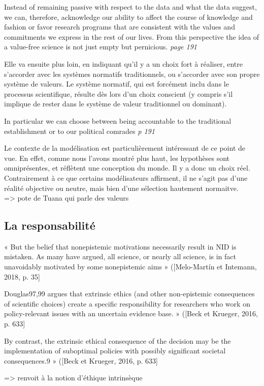 \begin{displayquote}
    Instead of remaining passive with respect to the data and what the data suggest, we can, therefore, acknowledge our ability to affect the course of knowledge and fashion or favor research programs that are consistent with the values and commitments we express in the rest of our lives. From this perspective the idea of a value-free science is not just empty but pernicious. \textit{page 191}
\end{displayquote}

Elle va ensuite plus loin, en indiquant qu'il y a un choix fort à réaliser, entre s'accorder avec les systèmes normatifs traditionnels, ou s'accorder avec son propre système de valeurs. Le système normatif, qui est forcément inclu dans le processus scientifique, résulte dès lors d'un choix conscient (y compris s'il implique de rester dans le système de valeur traditionnel ou dominant). 

\begin{displayquote}
    In particular we can choose between being accountable to the traditional establishment or to our political comrades \textit{p 191}
\end{displayquote}

Le contexte de la modélisation est particulièrement intéressant de ce point de vue. En effet, comme nous l'avons montré plus haut, les hypothèses sont omniprésentes, et réflètent une conception du monde. Il y a donc un choix réel. Contrairement à ce que certains modélisateurs affirment, il ne s'agit pas d'une réalité objective ou neutre, mais bien d'une sélection hautement normaitve. \\




\cite{helgeson_attention_2022} => pote de Tuana qui parle des valeurs

\subsection{La responsabilité}

\begin{displayquote}
    « But the belief that nonepistemic motivations necessarily result in NID is mistaken. As many have argued, all science, or nearly all science, is in fact unavoidably motivated by some nonepistemic aims » ([Melo-Martín et Intemann, 2018, p. 35]
\end{displayquote}


\begin{displayquote}
    Douglas97,99 argues that extrinsic ethics (and other non-epistemic consequences of scientific choices) create a specific responsibility for researchers who work on policy-relevant issues with an uncertain evidence base. » ([Beck et Krueger, 2016, p. 633]
\end{displayquote}
\begin{displayquote}
     By contrast, the extrinsic ethical consequence of the decision may be the implementation of suboptimal policies with possibly significant societal consequences.9 » ([Beck et Krueger, 2016, p. 633]
\end{displayquote}

=> renvoit à la notion d'éthique intrinsèque



